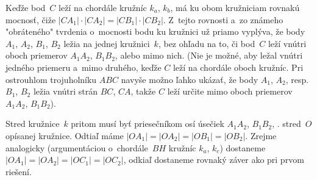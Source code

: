 {Keďže bod~$C$ leží na chordále kružníc $k_a$, $k_b$, má ku obom kružniciam rovnakú mocnosť, čiže $|CA_1|\cdot|CA_2|=|CB_1|\cdot|CB_2|$. Z~tejto rovnosti a~zo známeho "obráteného" tvrdenia o~mocnosti bodu ku kružnici už priamo vyplýva, že body $A_1$, $A_2$, $B_1$, $B_2$ ležia na jednej kružnici~$k$, bez ohľadu na to, či bod~$C$ leží vnútri oboch priemerov $A_1A_2$, $B_1B_2$, alebo mimo nich. (Nie je možné, aby ležal vnútri jedného priemeru a~mimo druhého, keďže $C$ leží na chordále oboch kružníc. Pri ostrouhlom trojuholníku $ABC$ navyše možno ľahko ukázať, že body $A_1$, $A_2$, resp. $B_1$, $B_2$ ležia vnútri strán $BC$, $CA$, takže $C$ leží určite mimo oboch priemerov $A_1A_2$, $B_1B_2$).

Stred kružnice~$k$ pritom musí byť priesečníkom osí úsečiek $A_1A_2$, $B_1B_2$, \tj. stred~$O$ opísanej kružnice. Odtiaľ máme $|OA_1|=|OA_2|=|OB_1|=|OB_2|$. Zrejme analogicky (argumentáciou o~chordále~$BH$ kružníc $k_a$, $k_c$) dostaneme $|OA_1|=|OA_2|=|OC_1|=|OC_2|$, odkiaľ dostaneme rovnaký záver ako pri prvom riešení.
}


